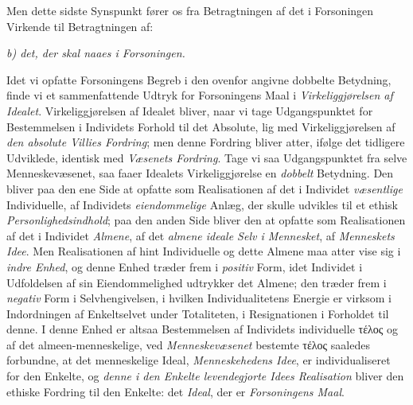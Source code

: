 Men dette sidste Synspunkt fører os fra Betragtningen af det i Forsoningen
Virkende til Betragtningen af:

\begin{center}
\emph{b) det, der skal naaes i Forsoningen.}
\end{center}

Idet vi opfatte Forsoningens Begreb i den ovenfor angivne dobbelte Betydning,
finde vi et sammenfattende Udtryk for Forsoningens Maal i
\emph{Virkeliggjørelsen af Idealet}. Virkeliggjørelsen af Idealet bliver, naar vi
tage Udgangspunktet for Bestemmelsen i Individets Forhold til det Absolute, lig
med Virkeliggjørelsen af \emph{den absolute Villies Fordring}; men denne Fordring
bliver atter, ifølge det tidligere Udviklede, identisk med \emph{Væsenets
Fordring}. Tage vi saa Udgangspunktet fra selve Menneskevæsenet, saa faaer
Idealets Virkeliggjørelse en \emph{dobbelt} Betydning. Den bliver paa den ene
Side at opfatte som Realisationen af det i Individet \emph{væsentlige}
Individuelle, af Individets \emph{eiendommelige} Anlæg, der skulle udvikles til
et ethisk \emph{Personlighedsindhold}; paa den anden Side bliver den
 at opfatte som Realisationen af det i Individet \emph{Almene}, af det
\emph{almene ideale Selv i Mennesket}, af \emph{Menneskets Idee}. Men
Realisationen af hint Individuelle og dette Almene maa atter vise sig i
\emph{indre Enhed}, og denne Enhed træder frem i \emph{positiv} Form, idet
Individet i Udfoldelsen af sin Eiendommelighed udtrykker det Almene; den træder
frem i \emph{negativ} Form i Selvhengivelsen, i hvilken Individualitetens Energie
er virksom i Indordningen af Enkeltselvet under Totaliteten, i Resignationen i
Forholdet til denne. I denne Enhed er altsaa Bestemmelsen af Individets
individuelle τέλος og af det almeen-menneskelige, ved \emph{Menneskevæsenet}
bestemte τέλος saaledes forbundne, at det menneskelige Ideal,
\emph{Menneskehedens Idee}, er individualiseret for den Enkelte, og \emph{denne i
den Enkelte levendegjorte Idees Realisation} bliver den ethiske Fordring til den
Enkelte: det \emph{Ideal}, der er \emph{Forsoningens Maal}.

